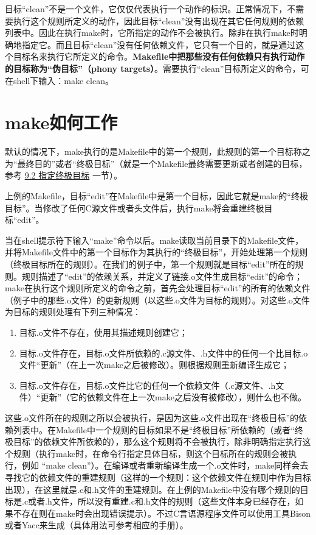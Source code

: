 目标“clean”不是一个文件，它仅仅代表执行一个动作的标识。正常情况下，不需要执行这个规则所定义的动作，因此目标“clean”没有出现在其它任何规则的依赖列表中。因此在执行make时，它所指定的动作不会被执行。除非在执行make时明确地指定它。而且目标“clean”没有任何依赖文件，它只有一个目的，就是通过这个目标名来执行它所定义的命令。\textbf{Makefile中把那些没有任何依赖只有执行动作的目标称为“伪目标”（phony targets）}。需要执行“clean”目标所定义的命令，可在shell下输入：make clean。


\section{make如何工作}

默认的情况下，make执行的是Makefile中的第一个规则，此规则的第一个目标称之为“最终目的”或者“终极目标”（就是一个Makefile最终需要更新或者创建的目标， 参考 \hyperref[sec:9.2]{9.2 指定终极目标} 一节）。

上例的Makefile，目标“edit”在Makefile中是第一个目标，因此它就是make的“终极目标”。当修改了任何C源文件或者头文件后，执行make将会重建终极目标“edit”。

当在shell提示符下输入“make”命令以后。make读取当前目录下的Makefile文件，并将Makefile文件中的第一个目标作为其执行的“终极目标”，开始处理第一个规则（终极目标所在的规则）。在我们的例子中，第一个规则就是目标“edit”所在的规则。规则描述了“edit”的依赖关系，并定义了链接.o文件生成目标“edit”的命令； make在执行这个规则所定义的命令之前，首先会处理目标“edit”的所有的依赖文件（例子中的那些.o文件）的更新规则（以这些.o文件为目标的规则）。对这些.o文件为目标的规则处理有下列三种情况：
\begin{enumerate}
\itemsep=0pt \parskip=0pt
    \item 目标.o文件不存在，使用其描述规则创建它；
    \item 目标.o文件存在，目标.o文件所依赖的.c源文件、.h文件中的任何一个比目标.o文件“更新”（在上一次make之后被修改）。则根据规则重新编译生成它；
    \item 目标.o文件存在，目标.o文件比它的任何一个依赖文件（.c源文件、.h文件）“更新”（它的依赖文件在上一次make之后没有被修改），则什么也不做。
\end{enumerate}

这些.o文件所在的规则之所以会被执行，是因为这些.o文件出现在“终极目标”的依赖列表中。在Makefile中一个规则的目标如果不是“终极目标”所依赖的（或者“终极目标”的依赖文件所依赖的），那么这个规则将不会被执行，除非明确指定执行这个规则（执行make时，在命令行指定具体目标，则这个目标所在的规则会被执行，例如 “make clean”）。在编译或者重新编译生成一个.o文件时，make同样会去寻找它的依赖文件的重建规则（这样的一个规则：这个依赖文件在规则中作为目标出现），在这里就是.c和.h文件的重建规则。在上例的Makefile中没有哪个规则的目标是.c或者.h文件，所以没有重建.c和.h文件的规则（这些文件本身已经存在，如果不存在则在make时会出现错误提示）。不过C言语源程序文件可以使用工具Bison或者Yacc来生成（具体用法可参考相应的手册）。

